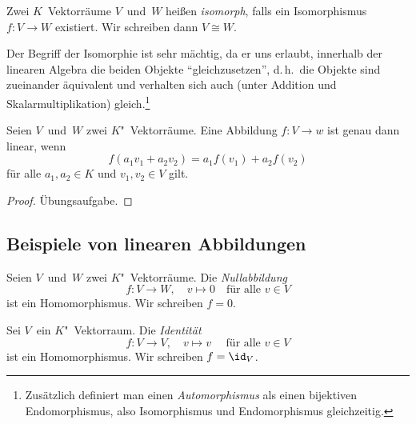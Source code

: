 \documentclass[a4paper]{article}
\begin{document}
\begin{definition}[isomorph]
    Zwei $K$~Vektorräume $V$~und~$W$ heißen \emph{isomorph}, falls ein Isomorphismus $f\colon V \to W$ existiert. Wir schreiben dann $V \cong W$.
\end{definition}

Der Begriff der Isomorphie ist sehr mächtig, da er uns erlaubt, innerhalb der linearen Algebra die beiden Objekte "`gleichzusetzen"', d.\,h.\ die Objekte sind zueinander äquivalent und verhalten sich auch (unter Addition und Skalarmultiplikation) gleich.\footnote{Zusätzlich definiert man einen \emph{Automorphismus} als einen bijektiven Endomorphismus, also Isomorphismus und Endomorphismus gleichzeitig.}

\begin{lemma}\label{lem:hom:def}
    Seien $V$~und~$W$ zwei $K$"~Vektorräume. Eine Abbildung $f\colon V \to w$ ist genau dann linear, wenn
    \begin{equation*}
        f(a_1v_1 + a_2v_2) = a_1f(v_1) + a_2f(v_2)
    \end{equation*}
    für alle $a_1,a_2 \in K$ und $v_1,v_2 \in V$ gilt.
\end{lemma}

\begin{proof}
    Übungsaufgabe.
\end{proof}

\subsection{Beispiele von linearen Abbildungen}

\begin{definition}[Nullabbildung]
    Seien $V$~und~$W$ zwei $K$"~Vektorräume. Die \emph{Nullabbildung}
    \begin{equation*}
        f\colon V \to W,\quad v \mapsto 0 \quad\text{für alle } v \in V
    \end{equation*}
    ist ein Homomorphismus. Wir schreiben $f = 0$.
\end{definition}

\begin{definition}[Identität]
    Sei $V$~ein $K$"~Vektorraum. Die \emph{Identität}
    \begin{equation*}
        f\colon V \to V,\quad v \mapsto v \quad\text{ für alle } v \in V
    \end{equation*}
    ist ein Homomorphismus. Wir schreiben $f = \id_V$.
\end{definition}
\end{document}
